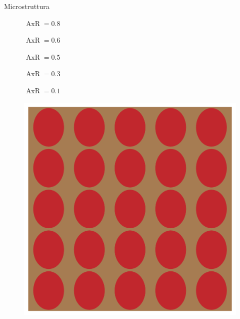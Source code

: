 \documentclass[aspectratio=169,xcolor=dvipsnames]{beamer}
\begin{document}
\begin{frame}{Microstruttura}
\begin{figure} 
	\centering
	\begin{minipage}[b]{0.16\linewidth}
		\centering
	\tiny	$\operatorname{AxR}=0.8	$
	\end{minipage}
	\begin{minipage}[b]{0.16\linewidth}
		\centering
	\tiny	$\operatorname{AxR}=0.6	$
	\end{minipage}
	\begin{minipage}[b]{0.16\linewidth}
		\centering
	\tiny	$	\operatorname{AxR}=0.5$
	\end{minipage}
	\begin{minipage}[b]{0.16\linewidth}
		\centering
	\tiny	$	\operatorname{AxR}=0.3$
	\end{minipage}
	\begin{minipage}[b]{0.16\linewidth}
		\centering
	\tiny	$	\operatorname{AxR}=0.1$
	\end{minipage} 
	\begin{minipage}[b]{0.16\linewidth}
		\includegraphics[width=\linewidth]{test_mesh_axR_0.8.png}
	\end{minipage} 
	\begin{minipage}[b]{0.16\linewidth}

\end{minipage}
\end{figure}
\end{frame}
\end{document}
